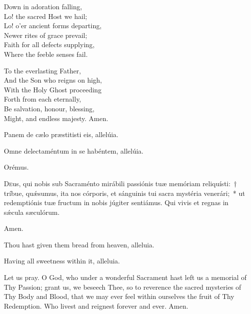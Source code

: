 \documentclass[11pt]{article}
\begin{document}
\begin{multicols}{2}
\raggedcolumns
\begin{otherlanguage}{english}
Down in adoration falling,\\
Lo! the sacred Host we hail;\\
Lo! o'er ancient forms departing,\\
Newer rites of grace prevail;\\
Faith for all defects supplying,\\
Where the feeble senses fail.

To the everlasting Father,\\
And the Son who reigns on high,\\
With the Holy Ghost proceeding\\
Forth from each eternally,\\
Be salvation, honour, blessing,\\
Might, and endless majesty.
Amen.
\end{otherlanguage}
\end{multicols}

   \begin{paracol}{2}
   
\noindent \vv Panem de cælo præstitisti eis, allelúia.

\noindent \rr Omne dele\-ctaméntum in se habéntem, allelúia.
  
  Orémus.
  
  \lettrine{D}{e}us, qui nobis sub Sacraménto mirábili passiónis tuæ memóriam reliquísti:~† tríbue, quǽsumus, ita nos córporis, et sánguinis tui sacra mystéria venerári;~* ut redemptiónis tuæ fructum in nobis júgiter sentiámus. Qui vivis et regnas in sǽcula sæculórum. 
  
  \rr Amen.
  \switchcolumn
\begin{otherlanguage}{english}
\noindent \vv Thou hast given them bread from heaven, alleluia.

\noindent \rr Having all sweetness within it, alleluia.

\noindent Let us pray. O God, who under a wonderful Sacrament hast left us a memorial of Thy Passion; grant us, we beseech Thee, so to reverence the sacred mysteries of Thy Body and Blood, that we may ever feel within ourselves the fruit of Thy Redemption. Who livest and reignest forever and ever. Amen.

\end{otherlanguage}
\end{paracol}
\end{document}

